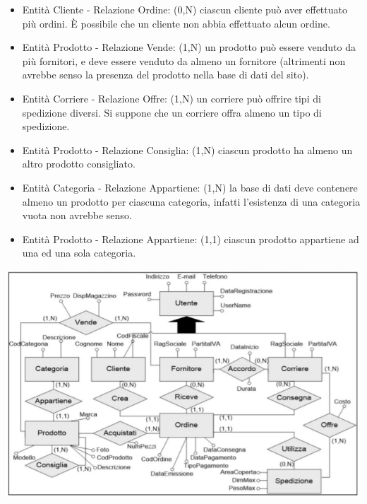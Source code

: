\begin{itemize}
	\item Entità Cliente - Relazione Ordine: (0,N) ciascun cliente può aver effettuato più ordini. È possibile che
	un cliente non abbia effettuato alcun ordine.
	\item Entità Prodotto - Relazione Vende: (1,N) un prodotto
	può essere venduto da più fornitori, e deve essere
	venduto da almeno un fornitore (altrimenti non
	avrebbe senso la presenza del prodotto nella base di
	dati del sito).
	\item Entità Corriere - Relazione Offre: (1,N) un corriere
	può offrire tipi di spedizione diversi. Si suppone che
	un corriere offra almeno un tipo di spedizione.
	\item Entità Prodotto - Relazione Consiglia: (1,N) ciascun
	prodotto ha almeno un altro prodotto consigliato.
	\item Entità Categoria - Relazione Appartiene: (1,N) la base
	di dati deve contenere almeno un prodotto per
	ciascuna categoria, infatti l’esistenza di una categoria
	vuota non avrebbe senso.
	\item Entità Prodotto - Relazione Appartiene: (1,1) ciascun
	prodotto appartiene ad una ed una sola categoria.
\end{itemize}
\begin{center}
	\includegraphics{images/90.PNG}
\end{center}
